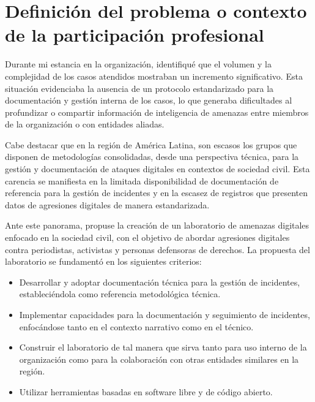 \documentclass[12pt]{caltech_thesis}
\begin{document}
\chapter{Definición del problema o contexto de la participación profesional}

Durante mi estancia en la organización, identifiqué que el volumen y la complejidad de los casos atendidos mostraban un incremento significativo. Esta situación evidenciaba la ausencia de un protocolo estandarizado para la documentación y gestión interna de los casos, lo que generaba dificultades al profundizar o compartir información de inteligencia de amenazas entre miembros de la organización o con entidades aliadas.

Cabe destacar que en la región de América Latina, son escasos los grupos que disponen de metodologías consolidadas, desde una perspectiva técnica, para la gestión y documentación de ataques digitales en contextos de sociedad civil. Esta carencia se manifiesta en la limitada disponibilidad de documentación de referencia para la gestión de incidentes y en la escasez de registros que presenten datos de agresiones digitales de manera estandarizada.

Ante este panorama, propuse la creación de un laboratorio de amenazas digitales enfocado en la sociedad civil, con el objetivo de abordar agresiones digitales contra periodistas, activistas y personas defensoras de derechos. La propuesta del laboratorio se fundamentó en los siguientes criterios:

\begin{itemize}
    \item Desarrollar y adoptar documentación técnica para la gestión de incidentes, estableciéndola como referencia metodológica técnica.
    \item Implementar capacidades para la documentación y seguimiento de incidentes, enfocándose tanto en el contexto narrativo como en el técnico.
    \item Construir el laboratorio de tal manera que sirva tanto para uso interno de la organización como para la colaboración con otras entidades similares en la región.
    \item Utilizar herramientas basadas en software libre y de código abierto.
\end{itemize}


\end{document}
